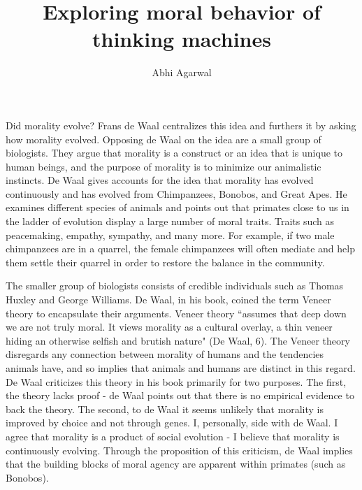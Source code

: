 \documentclass[11pt, oneside]{article}
\title{Exploring moral behavior of thinking machines}
\author{Abhi Agarwal}
\date{}
\begin{document}
\maketitle

\par 
Did morality evolve? Frans de Waal centralizes this idea and furthers it by asking how morality evolved. 
Opposing de Waal on the idea are a small group of biologists. They argue that morality is a construct or an idea that is unique to human beings, and the purpose of morality is to minimize our animalistic instincts. 
De Waal gives accounts for the idea that morality has evolved continuously and has evolved from Chimpanzees, Bonobos, and Great Apes. He examines different species of animals and points out that primates close to us in the ladder of evolution display a large number of moral traits. Traits such as peacemaking, empathy, sympathy, and many more. For example, if two male chimpanzees are in a quarrel, the female chimpanzees will often mediate and help them settle their quarrel in order to restore the balance in the community. 

\par 
The smaller group of biologists consists of credible individuals such as Thomas Huxley and George Williams. De Waal, in his book, coined the term Veneer theory to encapsulate their arguments. Veneer theory ``assumes that deep down we are not truly moral. It views morality as a cultural overlay, a thin veneer hiding an otherwise selfish and brutish nature" (De Waal, 6). The Veneer theory disregards any connection between morality of humans and the tendencies animals have, and so implies that animals and humans are distinct in this regard. 
De Waal criticizes this theory in his book primarily for two purposes. The first, the theory lacks proof - de Waal points out that there is no empirical evidence to back the theory. The second, to de Waal it seems unlikely that morality is improved by choice and not through genes. 
I, personally, side with de Waal. I agree that morality is a product of social evolution - I believe that morality is continuously evolving. 
Through the proposition of this criticism, de Waal implies that the building blocks of moral agency are apparent within primates (such as Bonobos).
\end{document}

